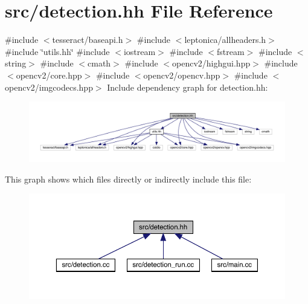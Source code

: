\hypertarget{detection_8hh}{}\section{src/detection.hh File Reference}
\label{detection_8hh}
{\ttfamily \#include $<$tesseract/baseapi.\+h$>$}\newline
{\ttfamily \#include $<$leptonica/allheaders.\+h$>$}\newline
{\ttfamily \#include \char`\"{}utils.\+hh\char`\"{}}\newline
{\ttfamily \#include $<$iostream$>$}\newline
{\ttfamily \#include $<$fstream$>$}\newline
{\ttfamily \#include $<$string$>$}\newline
{\ttfamily \#include $<$cmath$>$}\newline
{\ttfamily \#include $<$opencv2/highgui.\+hpp$>$}\newline
{\ttfamily \#include $<$opencv2/core.\+hpp$>$}\newline
{\ttfamily \#include $<$opencv2/opencv.\+hpp$>$}\newline
{\ttfamily \#include $<$opencv2/imgcodecs.\+hpp$>$}\newline
Include dependency graph for detection.\+hh\+:
\nopagebreak
\begin{figure}[H]
\begin{center}
\leavevmode
\includegraphics[width=350pt]{detection_8hh__incl}
\end{center}
\end{figure}
This graph shows which files directly or indirectly include this file\+:
\nopagebreak
\begin{figure}[H]
\begin{center}
\leavevmode
\includegraphics[width=350pt]{detection_8hh__dep__incl}
\end{center}
\end{figure}
